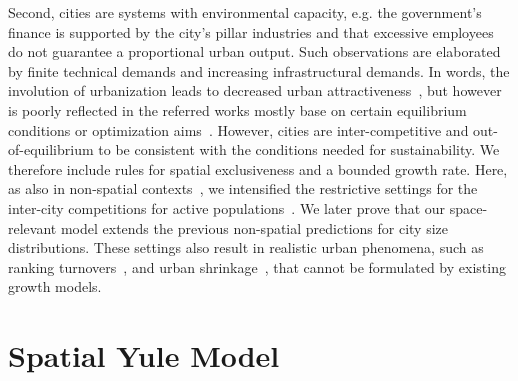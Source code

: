 Second, cities are systems with environmental capacity, e.g. the government's finance is supported by the city's pillar industries and that excessive employees do not guarantee a proportional urban output. Such observations are elaborated by finite technical demands and increasing infrastructural demands. In words, the involution of urbanization leads to decreased urban attractiveness~\cite{atkinson2012urban, girardin2009quantifying,gomez2018explaining,parris2003characterizing,batty2008size}, but however is poorly reflected in the referred works mostly base on certain equilibrium conditions or optimization aims~\cite{zipf1949human}. However, cities are inter-competitive and out-of-equilibrium to be consistent with the conditions needed for sustainability\cite{fujita1976spatial,louf2014congestion,ccolak2016understanding}. We therefore include rules for spatial exclusiveness and a bounded growth rate. Here, as also in non-spatial contexts~\cite{PhysRevE.55.R3817}, we intensified the restrictive settings for the inter-city competitions for active populations~\cite{batty2017urban}. We later prove that our space-relevant model extends the previous non-spatial predictions for city size distributions. These settings also result in realistic urban phenomena, such as ranking turnovers~\cite{gabaix2004evolution}, and urban shrinkage~\cite{haase2014conceptualizing}, that cannot be formulated by existing growth models.

\section{Spatial Yule Model}

